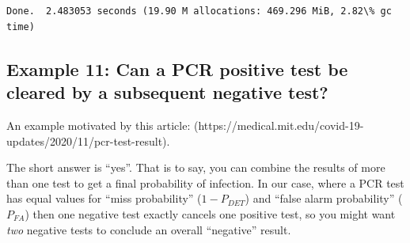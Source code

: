 \documentclass[11pt]{article}
\begin{document}
    \begin{center}
    \end{center}
    { \hspace*{\fill} \\}
    
    \begin{Verbatim}[commandchars=\\\{\}]

Done.  2.483053 seconds (19.90 M allocations: 469.296 MiB, 2.82\% gc time)
    \end{Verbatim}
\newpage
    \hypertarget{example-11-can-a-pcr-positive-test-be-cleared-by-a-subsequent-negative-test}{%
\subsection{Example 11: Can a PCR positive test be cleared by a
subsequent negative
test?}\label{example-11-can-a-pcr-positive-test-be-cleared-by-a-subsequent-negative-test}}

An example motivated by this article:
(https://medical.mit.edu/covid-19-updates/2020/11/pcr-test-result).

The short answer is ``yes''. That is to say, you can combine the results
of more than one test to get a final probability of infection. In our
case, where a PCR test has equal values for ``miss probability''
(\(1-P_{DET}\)) and ``false alarm probability'' (\(P_{FA}\)) then one
negative test exactly cancels one positive test, so you might want
\emph{two} negative tests to conclude an overall ``negative'' result.
\end{document}
